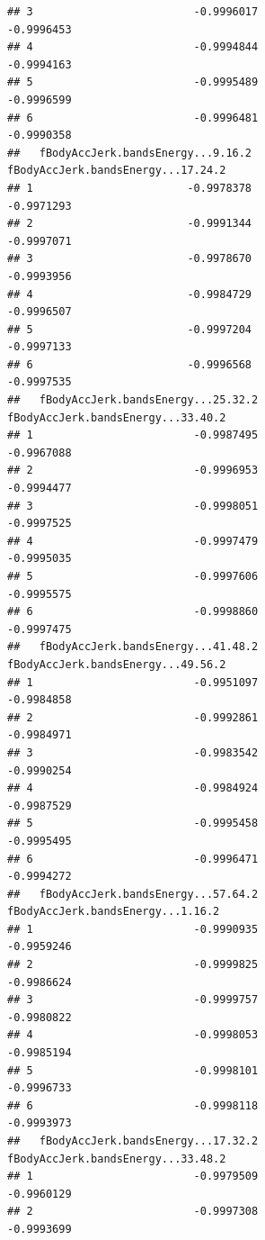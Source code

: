 \documentclass[
]{article}
\begin{document}
\begin{verbatim}
## 3                         -0.9996017                       -0.9996453
## 4                         -0.9994844                       -0.9994163
## 5                         -0.9995489                       -0.9996599
## 6                         -0.9996481                       -0.9990358
##   fBodyAccJerk.bandsEnergy...9.16.2 fBodyAccJerk.bandsEnergy...17.24.2
## 1                        -0.9978378                         -0.9971293
## 2                        -0.9991344                         -0.9997071
## 3                        -0.9978670                         -0.9993956
## 4                        -0.9984729                         -0.9996507
## 5                        -0.9997204                         -0.9997133
## 6                        -0.9996568                         -0.9997535
##   fBodyAccJerk.bandsEnergy...25.32.2 fBodyAccJerk.bandsEnergy...33.40.2
## 1                         -0.9987495                         -0.9967088
## 2                         -0.9996953                         -0.9994477
## 3                         -0.9998051                         -0.9997525
## 4                         -0.9997479                         -0.9995035
## 5                         -0.9997606                         -0.9995575
## 6                         -0.9998860                         -0.9997475
##   fBodyAccJerk.bandsEnergy...41.48.2 fBodyAccJerk.bandsEnergy...49.56.2
## 1                         -0.9951097                         -0.9984858
## 2                         -0.9992861                         -0.9984971
## 3                         -0.9983542                         -0.9990254
## 4                         -0.9984924                         -0.9987529
## 5                         -0.9995458                         -0.9995495
## 6                         -0.9996471                         -0.9994272
##   fBodyAccJerk.bandsEnergy...57.64.2 fBodyAccJerk.bandsEnergy...1.16.2
## 1                         -0.9990935                        -0.9959246
## 2                         -0.9999825                        -0.9986624
## 3                         -0.9999757                        -0.9980822
## 4                         -0.9998053                        -0.9985194
## 5                         -0.9998101                        -0.9996733
## 6                         -0.9998118                        -0.9993973
##   fBodyAccJerk.bandsEnergy...17.32.2 fBodyAccJerk.bandsEnergy...33.48.2
## 1                         -0.9979509                         -0.9960129
## 2                         -0.9997308                         -0.9993699

\end{verbatim}
\end{document}
